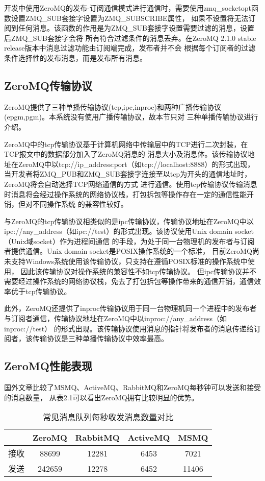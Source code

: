 开发中使用ZeroMQ的发布-订阅通信模式进行通信时，需要使用zmq\_socketopt函数设置ZMQ\_SUB套接字设置为ZMQ\_SUBSCRIBE属性，
如果不设置将无法订阅到任何消息。该函数的作用是为ZMQ\_SUB套接字设置需要过滤的消息，设置后ZMQ\_SUB套接字会将
所有符合过滤条件的消息丢弃。在ZeroMQ 2.1.0 stable release版本中消息过滤功能由订阅端完成，发布者并不会
根据每个订阅者的过滤条件选择性的发布消息，而是发布所有消息。

\subsection{ZeroMQ传输协议}
ZeroMQ提供了三种单播传输协议(tcp,ipc,inproc)和两种广播传输协议(epgm,pgm)。本系统没有使用广播传输协议，故本节只对
三种单播传输协议进行介绍。

ZeroMQ中的tcp传输协议基于计算机网络中传输层中的TCP进行二次封装，在TCP报文中的数据部分加入了ZeroMQ消息的
消息大小及消息体。该传输协议地址在ZeroMQ中以tcp://ip\_address:port（如tcp://localhost:8888）的形式出现，
当开发者将ZMQ\_PUB和ZMQ\_SUB套接字连接至以tcp为开头的通信地址时，ZeroMQ将会自动选择TCP网络通信的方式
进行通信。使用tcp传输协议传输消息时消息将会经过操作系统的网络协议栈，打包拆包等操作存在一定的通信性能开销，但对不同操作系统
的兼容性较好。

与ZeroMQ的tcp传输协议相类似的是ipc传输协议，传输协议地址在ZeroMQ中以ipc://any\_address（如ipc://test）的形式出现。该协议使用Unix domain socket（Unix域socket）作为进程间通信
的手段，为处于同一台物理机的发布者与订阅者提供通信。Unix domain socket是POSIX操作系统的一个标准，
目前ZeroMQ尚未支持Windows系统使用该传输协议，只支持在遵循POSIX标准的操作系统中使用，
因此该传输协议对操作系统的兼容性不如tcp传输协议。
但ipc传输协议并不需要经过操作系统的网络协议栈，免去了打包拆包等操作带来的通信开销，通信效率优于tcp传输协议。

此外，ZeroMQ还提供了inproc传输协议用于同一台物理机同一个进程中的发布者与订阅者通信，传输协议地址在ZeroMQ中以inproc://any\_address（如inproc://test）
的形式出现。该传输协议使用消息的指针将发布者的消息传递给订阅者，该传输协议是三种单播传输协议中效率最高。

\subsection{ZeroMQ性能表现}
国外文章\cite{mqcompare}比较了MSMQ、ActiveMQ、RabbitMQ和ZeroMQ每秒钟可以发送和接受的消息数量，
从表2.1可以看出ZeroMQ拥有比较明显的优势。
\begin{table}[htb]
  \centering\small
  \caption{常见消息队列每秒收发消息数量对比\cite{mqcompare}}
  \label{tab:exampletable}
  \begin{tabular}{ccccc}
    \toprule
    & ZeroMQ & RabbitMQ & ActiveMQ & MSMQ \\
    \midrule
    接收 & 88699 & 12281 & 6453 & 7021 \\
    发送 & 242659 & 12278 & 6452 & 11406 \\
    \bottomrule
  \end{tabular}
\end{table}

